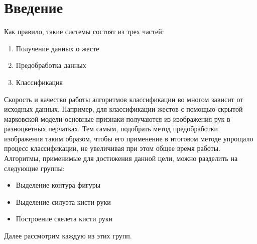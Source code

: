 \section{Введение}
\label{sec:Intro}


Как правило, такие системы состоят из трех частей:

\begin{enumerate}
	\item Получение данных о жесте
	\item Предобработка данных
	\item Классификация
\end{enumerate}

Скорость и качество работы алгоритмов классификации во многом зависит от исходных данных. Например, для классификации жестов с помощью скрытой марковской модели \cite{inproceedings} основные признаки получаются из изображения рук в разноцветных перчатках. Тем самым, подобрать метод предобработки изображения таким образом, чтобы его применение в итоговом методе упрощало процесс классификации, не увеличивая при этом общее время работы. Алгоритмы, применимые для достижения данной цели, можно разделить на следующие группы:
\begin{itemize}
	\item Выделение контура фигуры
	\item Выделение силуэта кисти руки
	\item Построение скелета кисти руки
\end{itemize}

Далее рассмотрим каждую из этих групп.